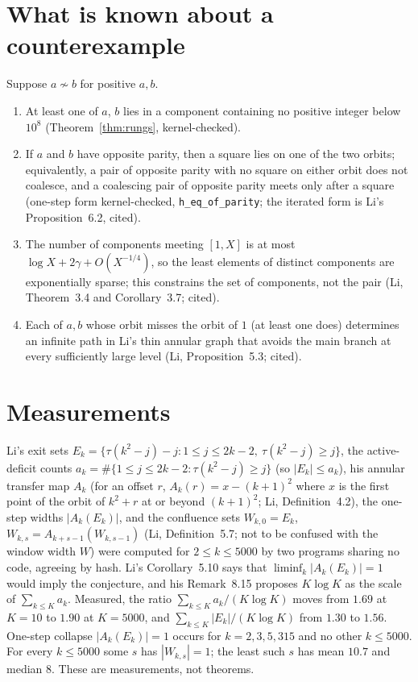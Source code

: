 \documentclass[11pt]{article}
\theoremstyle{plain}
\theoremstyle{definition}
\newcommand{\Coal}{\sim}
\begin{document}
\section{What is known about a counterexample}
\label{sec:checklist}

Suppose $a\not\Coal b$ for positive $a,b$.
\begin{enumerate}
\item At least one of $a$, $b$ lies in a component containing no positive integer below $10^8$ (Theorem~\ref{thm:rungs}, kernel-checked).
\item If $a$ and $b$ have opposite parity, then a square lies on one of the two orbits; equivalently, a pair of opposite parity with no square on either orbit does not coalesce, and a coalescing pair of opposite parity meets only after a square (one-step form kernel-checked, \texttt{h\_eq\_of\_parity}; the iterated form is Li's Proposition~6.2, cited).
\item The number of components meeting $[1,X]$ is at most $\log X+2\gamma+O(X^{-1/4})$, so the least elements of distinct components are exponentially sparse; this constrains the set of components, not the pair (Li, Theorem~3.4 and Corollary~3.7; cited).
\item Each of $a,b$ whose orbit misses the orbit of $1$ (at least one does) determines an infinite path in Li's thin annular graph that avoids the main branch at every sufficiently large level (Li, Proposition~5.3; cited).
\end{enumerate}

\section{Measurements}
\label{sec:measure}

Li's exit sets $E_k=\{\tau(k^2-j)-j : 1\le j\le 2k-2,\ \tau(k^2-j)\ge j\}$, the active-deficit counts $a_k=\#\{1\le j\le 2k-2 : \tau(k^2-j)\ge j\}$ (so $|E_k|\le a_k$), his annular transfer map $A_k$ (for an offset $r$, $A_k(r)=x-(k+1)^2$ where $x$ is the first point of the orbit of $k^2+r$ at or beyond $(k+1)^2$; Li, Definition~4.2), the one-step widths $|A_k(E_k)|$, and the confluence sets $W_{k,0}=E_k$, $W_{k,s}=A_{k+s-1}(W_{k,s-1})$ (Li, Definition~5.7; not to be confused with the window width $W$) were computed for $2\le k\le 5000$ by two programs sharing no code, agreeing by hash. Li's Corollary~5.10 says that $\liminf_k|A_k(E_k)|=1$ would imply the conjecture, and his Remark~8.15 proposes $K\log K$ as the scale of $\sum_{k\le K}a_k$. Measured, the ratio $\sum_{k\le K}a_k/(K\log K)$ moves from $1.69$ at $K=10$ to $1.90$ at $K=5000$, and $\sum_{k\le K}|E_k|/(K\log K)$ from $1.30$ to $1.56$. One-step collapse $|A_k(E_k)|=1$ occurs for $k=2,3,5,315$ and no other $k\le 5000$. For every $k\le 5000$ some $s$ has $|W_{k,s}|=1$; the least such $s$ has mean $10.7$ and median $8$. These are measurements, not theorems.
\end{document}
